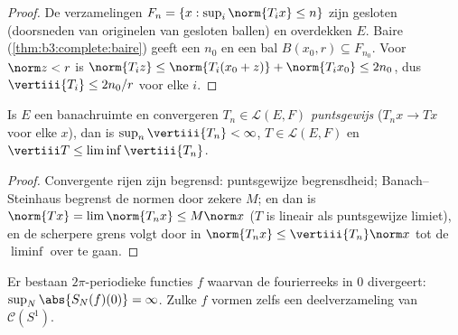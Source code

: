 \begin{proof}
De verzamelingen $F_n = \{x : \sup_i\norm{T_ix} \leq n\}$ zijn
gesloten (doorsneden van originelen van gesloten ballen) en
overdekken $E$. Baire (\cref{thm:b3:complete:baire}) geeft een
$n_0$ en een bal $B(x_0, r) \subseteq F_{n_0}$. Voor $\norm z <
r$ is $\norm{T_iz} \leq \norm{T_i(x_0 + z)} + \norm{T_ix_0} \leq
2n_0$, dus $\vertiii{T_i} \leq 2n_0/r$ voor elke $i$.
\end{proof}

\begin{corollary}\label{cor:b3:banach:bslimits}
Is $E$ een banachruimte en convergeren $T_n \in \mathcal L(E,F)$
\emph{puntsgewijs} ($T_nx \to Tx$ voor elke $x$), dan is $\sup_n
\vertiii{T_n} < \infty$, $T \in \mathcal L(E, F)$ en $\vertiii T
\leq \liminf \vertiii{T_n}$.
\end{corollary}

\begin{proof}
Convergente rijen zijn begrensd: puntsgewijze begrensdheid;
Banach--Steinhaus begrenst de normen door zekere $M$; en dan is
$\norm{Tx} = \lim\norm{T_nx} \leq M\norm x$ ($T$ is lineair als
puntsgewijze limiet), en de scherpere grens volgt door in
$\norm{T_nx} \leq \vertiii{T_n}\norm x$ tot de $\liminf$ over te
gaan.
\end{proof}

\begin{theorem}
\label{thm:b3:banach:fourierdiverge}
Er bestaan  $2\pi$-periodieke functies $f$ waarvan de
fourierreeks in $0$ divergeert: $\sup_N\abs{S_N(f)(0)} = \infty$.
Zulke $f$ vormen zelfs een  deelverzameling van $\mathcal
C(S^1)$.
\end{theorem}

